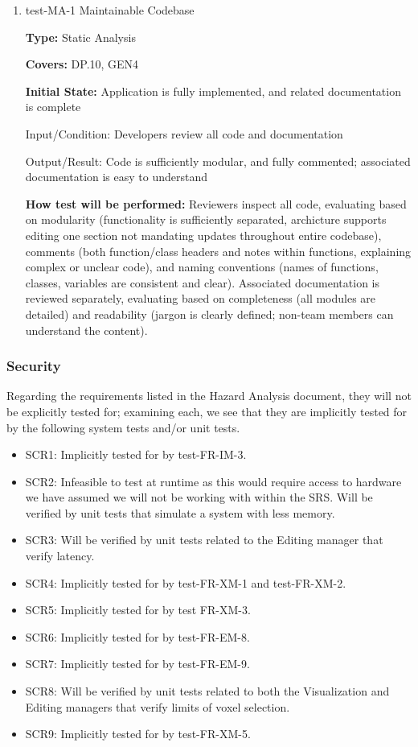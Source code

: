 \documentclass[12pt, titlepage]{article}
\begin{document}
\begin{enumerate}

\item{test-MA-1 Maintainable Codebase\\}

\textbf{Type:} Static Analysis

\textbf{Covers:} DP.10, GEN4 %
					
\textbf{Initial State:} Application is fully implemented, and related documentation is complete
					
Input/Condition: Developers review all code and documentation
					
Output/Result: Code is sufficiently modular, and fully commented; associated documentation is easy to understand
					
\textbf{How test will be performed:} Reviewers inspect all code, evaluating based on modularity (functionality is sufficiently separated,
archicture supports editing one section not mandating updates throughout entire codebase), comments (both function/class headers and notes 
within functions, explaining complex or unclear code), and naming conventions (names of functions, classes, variables are consistent
and clear). Associated documentation is reviewed separately, evaluating based on completeness (all modules are detailed) and readability
(jargon is clearly defined; non-team members can understand the content).

\end{enumerate}

\subsubsection{Security}

Regarding the requirements listed in the Hazard Analysis document, they will not be explicitly tested for; examining each, we see that they
are implicitly tested for by the following system tests and/or unit tests.

\begin{itemize}
  \item SCR1: Implicitly tested for by test-FR-IM-3.
  \item SCR2: Infeasible to test at runtime as this would require access to hardware we have assumed we will not be working with within the SRS.
  Will be verified by unit tests that simulate a system with less memory.
  \item SCR3: Will be verified by unit tests related to the Editing manager that verify latency.
  \item SCR4: Implicitly tested for by test-FR-XM-1 and test-FR-XM-2.
  \item SCR5: Implicitly tested for by test FR-XM-3.
  \item SCR6: Implicitly tested for by test-FR-EM-8.
  \item SCR7: Implicitly tested for by test-FR-EM-9.
  \item SCR8: Will be verified by unit tests related to both the Visualization and Editing managers that verify limits of voxel selection.
  \item SCR9: Implicitly tested for by test-FR-XM-5.
\end{itemize}
\end{document}

